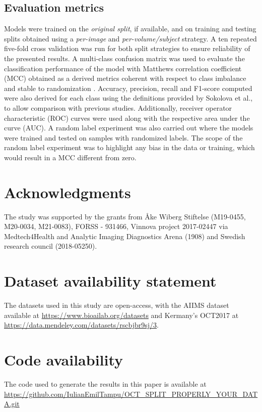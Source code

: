 \documentclass[fleqn,10pt]{wlscirep}
\begin{document}
\subsection*{Evaluation metrics}
Models were trained on the \textit{original split}, if available, and on training and testing splits obtained using a \textit{per-image} and \textit{per-volume/subject} strategy. A ten repeated five-fold cross validation was run for both split strategies to ensure reliability of the presented results.  A multi-class confusion matrix was used to evaluate the classification performance of the model with Matthews correlation coefficient (MCC) obtained as a derived metrics coherent with respect to class imbalance and stable to randomization \cite{jurman2012comparison}.  Accuracy, precision, recall and F1-score computed were also derived for each class using the definitions provided by Sokolova et al., \cite{sokolova2009systematic} to allow comparison with previous studies.  Additionally, receiver operator characteristic (ROC) curves were used along with the respective area under the curve (AUC).  A random label experiment was also carried out where the models were trained and tested on samples with randomized labels. The scope of the random label experiment was to highlight any bias in the data or training, which would result in a MCC different from zero. 

\section*{Acknowledgments}
The study was supported by the grants from Åke Wiberg Stiftelse (M19-0455, M20-0034, M21-0083), FORSS - 931466, Vinnova project 2017-02447 via Medtech4Health and Analytic Imaging Diagnostics Arena (1908) and Swedish research council (2018-05250).

\section*{Dataset availability statement}
The datasets used in this study are open-access, with the AIIMS dataset \cite{butola2019volumetric} available at \url{https://www.bioailab.org/datasets}  and Kermany’s  OCT2017 \cite{kermany2018large} at \url{https://data.mendeley.com/datasets/rscbjbr9sj/3}. 

\section*{Code availability}
The code used to generate the results in this paper is available at \url{https://github.com/IulianEmilTampu/OCT_SPLIT_PROPERLY_YOUR_DATA.git}
\end{document}
